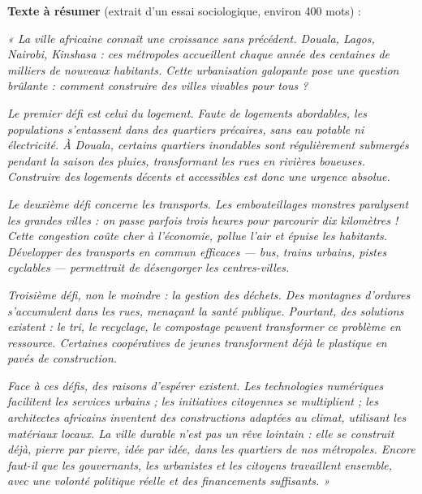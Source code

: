 \documentclass[11pt]{article}
\begin{document}
\begin{exercice}
\textbf{Texte à résumer} (extrait d'un essai sociologique, environ 400 mots) :

\emph{« La ville africaine connaît une croissance sans précédent. Douala, Lagos, Nairobi, Kinshasa : ces métropoles accueillent chaque année des centaines de milliers de nouveaux habitants. Cette urbanisation galopante pose une question brûlante : comment construire des villes vivables pour tous ?}

\emph{Le premier défi est celui du logement. Faute de logements abordables, les populations s'entassent dans des quartiers précaires, sans eau potable ni électricité. À Douala, certains quartiers inondables sont régulièrement submergés pendant la saison des pluies, transformant les rues en rivières boueuses. Construire des logements décents et accessibles est donc une urgence absolue.}

\emph{Le deuxième défi concerne les transports. Les embouteillages monstres paralysent les grandes villes : on passe parfois trois heures pour parcourir dix kilomètres ! Cette congestion coûte cher à l'économie, pollue l'air et épuise les habitants. Développer des transports en commun efficaces — bus, trains urbains, pistes cyclables — permettrait de désengorger les centres-villes.}

\emph{Troisième défi, non le moindre : la gestion des déchets. Des montagnes d'ordures s'accumulent dans les rues, menaçant la santé publique. Pourtant, des solutions existent : le tri, le recyclage, le compostage peuvent transformer ce problème en ressource. Certaines coopératives de jeunes transforment déjà le plastique en pavés de construction.}

\emph{Face à ces défis, des raisons d'espérer existent. Les technologies numériques facilitent les services urbains ; les initiatives citoyennes se multiplient ; les architectes africains inventent des constructions adaptées au climat, utilisant les matériaux locaux. La ville durable n'est pas un rêve lointain : elle se construit déjà, pierre par pierre, idée par idée, dans les quartiers de nos métropoles. Encore faut-il que les gouvernants, les urbanistes et les citoyens travaillent ensemble, avec une volonté politique réelle et des financements suffisants. »}


\end{exercice}
\end{document}
